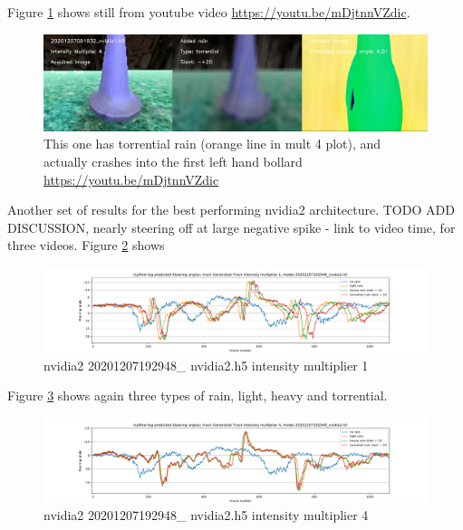 Figure  \ref{fig:youtube20201207091932nvidia1torrential20mult_4_h5} shows still from youtube video \url{https://youtu.be/mDjtnnVZdic}.
\begin{figure}[ht]
 \centering 
 \includegraphics[width=\textwidth]{Figures/youtube20201207091932nvidia1torrential20mult_4_h5.png}
 \caption{This one has torrential rain (orange line in mult 4 plot), and actually crashes into the first left hand bollard \url{https://youtu.be/mDjtnnVZdic}}
 \label{fig:youtube20201207091932nvidia1torrential20mult_4_h5} 
\end{figure}

Another set of results for the best performing nvidia2 architecture. TODO ADD DISCUSSION, nearly steering off at large negative spike - link to video time, for three videos.  
Figure \ref{fig:sa_GeneratedTrackintensitymultiplier1_20201207192948_nvidia2} shows
\begin{figure}[ht]
 \centering 
 \includegraphics[width=\textwidth]{Figures/sa_GeneratedTrackintensitymultiplier1_20201207192948_nvidia2.h5}
 \caption{nvidia2 20201207192948\_ nvidia2.h5 intensity multiplier 1}
 \label{fig:sa_GeneratedTrackintensitymultiplier1_20201207192948_nvidia2} 
\end{figure}

Figure \ref{fig:sa_GeneratedTrackintensitymultiplier4_20201207192948_nvidia2} shows again three types of rain, light, heavy and torrential.
\begin{figure}[ht]
 \centering 
 \includegraphics[width=\textwidth]{Figures/sa_GeneratedTrackintensitymultiplier4_20201207192948_nvidia2.h5}
 \caption{nvidia2 20201207192948\_ nvidia2.h5 intensity multiplier 4}
 \label{fig:sa_GeneratedTrackintensitymultiplier4_20201207192948_nvidia2} 
\end{figure}

